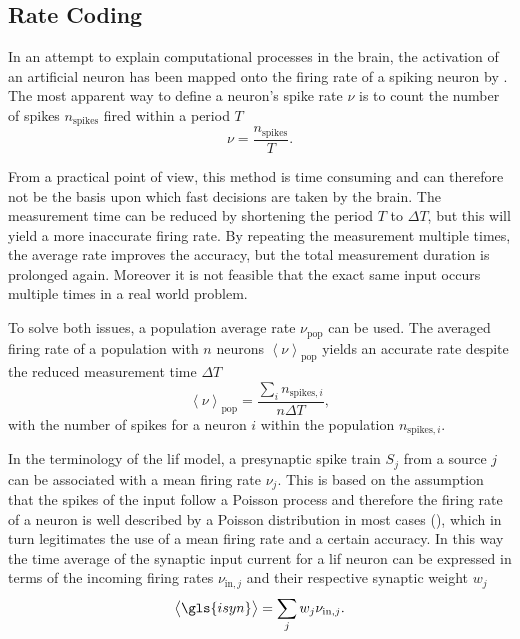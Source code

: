 \subsection{Rate Coding}
\label{ratecoding}
In an attempt to explain computational processes in the brain, the activation of an artificial neuron has been mapped onto the firing rate of a spiking neuron by \cite{rieke1999spikes}. The most apparent way to define a neuron's spike rate $\nu$ is to count the number of spikes $n_\text{spikes}$ fired within a period $T$
\begin{equation*}
\nu = \frac{n_\text{spikes}}{T}.
\label{eqratecoding}
\end{equation*}


From a practical point of view, this method is time consuming and can therefore not be the basis upon which fast decisions are taken by the brain. The measurement time can be reduced by shortening the period $T$ to $\Delta T$, but this will yield a more inaccurate firing rate. By repeating the measurement multiple times, the average rate improves the accuracy, but the total measurement duration is prolonged again. Moreover it is not feasible that the exact same input occurs multiple times in a real world problem.

To solve both issues, a population average rate $\nu_\text{pop}$ can be used. The averaged firing rate of a population with $n$ neurons $\left\langle\nu \right\rangle_\text{pop}$ yields an accurate rate despite the reduced measurement time $\Delta T$
\begin{equation*}
\left\langle\nu \right\rangle_\text{pop} = \frac{\sum_i n_{\text{spikes},i}}{n \Delta T},
\end{equation*}
with the number of spikes for a neuron $i$ within the population $n_{\text{spikes}, i}$.

In the terminology of the \gls{lif} model, a presynaptic spike train $S_j$ from a source $j$ can be associated with a mean firing rate $\nu_j$. This is based on the assumption that the spikes of the input follow a Poisson process and therefore the firing rate of a neuron is well described by a Poisson distribution in most cases (\citealp{averbeck2009poisson}), which in turn legitimates the use of a mean firing rate and a certain accuracy. In this way the time average of the synaptic input current for a \gls{lif} neuron can be expressed in terms of the incoming firing rates $\nu_{\text{in}, j}$ and their respective synaptic weight $w_j$
\begin{equation*}
\left\langle \gls{isyn} \right\rangle = \sum_j w_j \nu_{\text{in}, j}.
\end{equation*}

